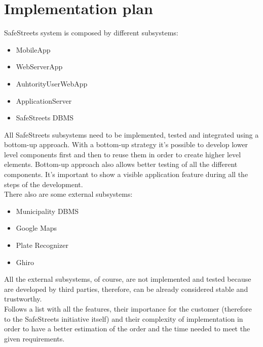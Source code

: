     \section{Implementation plan}
    SafeStreets system is composed by different subsystems:
    \begin{itemize}
        \item MobileApp
        \item WebServerApp
        \item AuhtorityUserWebApp
        \item ApplicationServer
        \item SafeStreets DBMS
    \end{itemize}   
    All SafeStreets subsystems need to be implemented, tested and integrated
    using a bottom-up approach. With a bottom-up strategy it's possible to
    develop lower level components first and then to reuse them in order to
    create higher level elements. Bottom-up approach also allows better testing
    of all the different components. It's important to show a visible
    application feature during all the steps of the development.\\
    There also are some external subsystems: 
    \begin{itemize}
        \item Municipality DBMS
        \item Google Maps
        \item Plate Recognizer
        \item Ghiro
    \end{itemize}   
    All the external subsystems, of course, are not implemented and tested
    because are developed by third parties, therefore, can be already considered
    stable and trustworthy.\\
    Follows a list with all the features, their importance for the customer
    (therefore to the SafeStreets initiative itself) and their complexity of
    implementation in order to have a better estimation of the order and the
    time needed to meet the given requirements.
